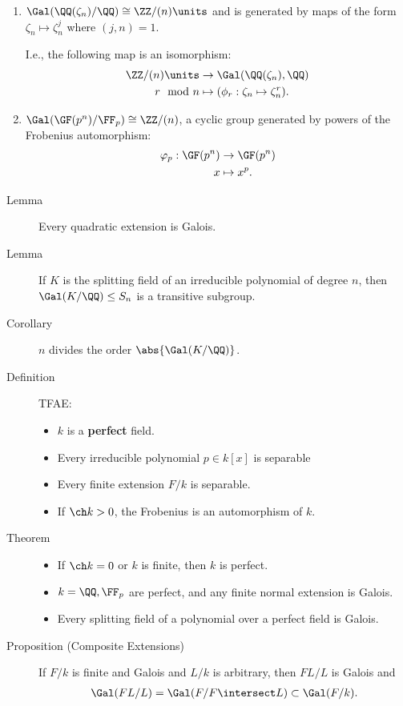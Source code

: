 \begin{enumerate}
\def\labelenumi{\arabic{enumi}.}
\item
  \(\Gal(\QQ(\zeta_n)/\QQ) \cong \ZZ/(n)\units\) and is generated by
  maps of the form \(\zeta_n \mapsto \zeta_n^j\) where \((j, n) = 1\).

  I.e., the following map is an isomorphism: \begin{align*}
  \ZZ/(n)\units &\to \Gal(\QQ(\zeta_n), \QQ) \\
  r \mod n &\mapsto (\phi_r: \zeta_n \mapsto \zeta_n^r )
  .\end{align*}
\item
  \(\Gal(\GF(p^n)/\FF_p) \cong \ZZ/(n)\), a cyclic group generated by
  powers of the Frobenius automorphism: \begin{align*}
  \varphi_p: \GF(p^n) &\to \GF(p^n) \\
  x &\mapsto x^p
  .\end{align*}
\end{enumerate}

\begin{description}
\item[Lemma]
Every quadratic extension is Galois.
\item[Lemma]
If \(K\) is the splitting field of an irreducible polynomial of degree
\(n\), then \(\Gal(K/\QQ) \leq S_n\) is a transitive subgroup.
\item[Corollary]
\(n\) divides the order \(\abs{ \Gal(K/\QQ)}\).
\item[Definition]
TFAE:

\begin{itemize}
\item
  \(k\) is a \textbf{perfect} field.
\item
  Every irreducible polynomial \(p\in k[x]\) is separable
\item
  Every finite extension \(F/k\) is separable.
\item
  If \(\ch k > 0\), the Frobenius is an automorphism of \(k\).
\end{itemize}
\item[Theorem]
\hfill

\begin{itemize}
\item
  If \(\ch k = 0\) or \(k\) is finite, then \(k\) is perfect.
\item
  \(k = \QQ, \FF_p\) are perfect, and any finite normal extension is
  Galois.
\item
  Every splitting field of a polynomial over a perfect field is Galois.
\end{itemize}
\item[Proposition (Composite Extensions)]
If \(F/k\) is finite and Galois and \(L/k\) is arbitrary, then \(FL/L\)
is Galois and
\begin{align*}
\Gal(FL/L) = \Gal(F / F\intersect L) \subset \Gal(F/k)
.\end{align*}
\end{description}

